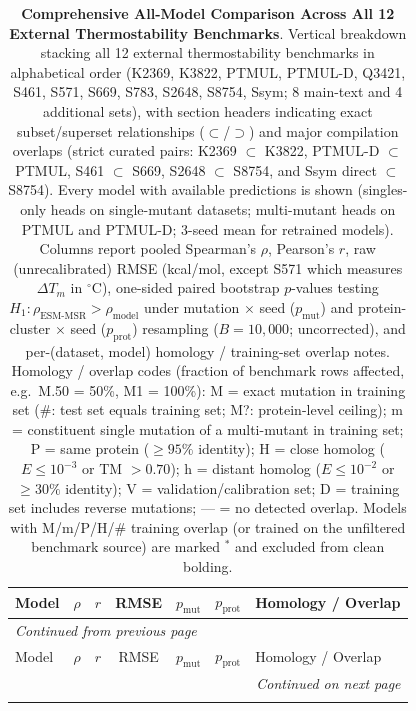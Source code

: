 {
\scriptsize
\setlength{\tabcolsep}{4pt}
\begin{longtable}{lcccccl}
\caption{\textbf{Comprehensive All-Model Comparison Across All 12 External Thermostability Benchmarks}. Vertical breakdown stacking all 12 external thermostability benchmarks in alphabetical order (K2369, K3822, PTMUL, PTMUL-D, Q3421, S461, S571, S669, S783, S2648, S8754, Ssym; 8 main-text and 4 additional sets), with section headers indicating exact subset/superset relationships ($\subset$/$\supset$) and major compilation overlaps (strict curated pairs: K2369 $\subset$ K3822, PTMUL-D $\subset$ PTMUL, S461 $\subset$ S669, S2648 $\subset$ S8754, and Ssym direct $\subset$ S8754). Every model with available predictions is shown (singles-only heads on single-mutant datasets; multi-mutant heads on PTMUL and PTMUL-D; 3-seed mean for retrained models). Columns report pooled Spearman's $\rho$, Pearson's $r$, raw (unrecalibrated) RMSE (kcal/mol, except S571 which measures $\Delta T_m$ in $^\circ$C), one-sided paired bootstrap $p$-values testing $H_1\colon \rho_{\text{ESM-MSR}} > \rho_{\text{model}}$ under mutation $\times$ seed ($p_{\mathrm{mut}}$) and protein-cluster $\times$ seed ($p_{\mathrm{prot}}$) resampling ($B=10{,}000$; uncorrected), and per-(dataset, model) homology / training-set overlap notes. Homology / overlap codes (fraction of benchmark rows affected, e.g.\ M.50 = 50\%, M1 = 100\%): M = exact mutation in training set (\#: test set equals training set; M?: protein-level ceiling); m = constituent single mutation of a multi-mutant in training set; P = same protein ($\ge 95\%$ identity); H = close homolog ($E\le 10^{-3}$ or TM $>0.70$); h = distant homolog ($E\le 10^{-2}$ or $\ge 30\%$ identity); V = validation/calibration set; D = training set includes reverse mutations; --- = no detected overlap. Models with M/m/P/H/\# training overlap (or trained on the unfiltered benchmark source) are marked $^*$ and excluded from clean bolding.}\label{tab:si_thermostability_all} \\
\toprule
Model & $\rho$ & $r$ & RMSE & $p_{\mathrm{mut}}$ & $p_{\mathrm{prot}}$ & Homology / Overlap \\
\midrule
\endfirsthead
\multicolumn{7}{l}{\textit{Continued from previous page}} \\
\toprule
Model & $\rho$ & $r$ & RMSE & $p_{\mathrm{mut}}$ & $p_{\mathrm{prot}}$ & Homology / Overlap \\
\midrule
\endhead
\midrule
\multicolumn{7}{r}{\textit{Continued on next page}} \\
\endfoot
\bottomrule

\end{longtable}}
